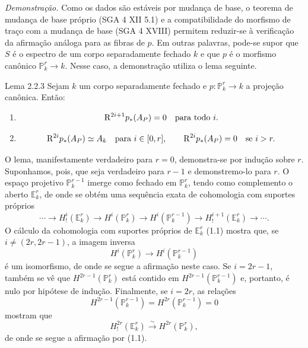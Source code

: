 \emph{Demonstração.} Como os dados são estáveis por mudança de base, o teorema de mudança de base próprio (SGA 4 XII 5.1) e a compatibilidade do morfismo de traço com a mudança de base (SGA 4 XVIII) permitem reduzir-se à verificação da afirmação análoga para as fibras de $p$. Em outras palavras, pode-se supor que $S$ é o espectro de um corpo separadamente fechado $k$ e que $p$ é o morfismo canônico $\mathbb P^r_k\to k$. Nesse caso, a demonstração utiliza o lema seguinte.

\begin{statement}{Lema 2.2.3}
Sejam $k$ um corpo separadamente fechado e $p:\mathbb P_k^r\to k$ a projeção canônica. Então:
\begin{enumerate}[label=\alph*)]
\item
\[
\mathrm{R}^{2i+1}p_*(A_P)=0\quad\text{para todo }i.
\]
\item
\[
\mathrm{R}^{2i}p_*(A_P)\simeq A_k\quad\text{para }i\in[0,r],
\qquad
\mathrm{R}^{2i}p_*(A_P)=0\quad\text{se }i>r.
\]
\end{enumerate}
\end{statement}

O lema, manifestamente verdadeiro para $r=0$, demonstra-se por indução sobre $r$. Suponhamos, pois, que seja verdadeiro para $r-1$ e demonstremo-lo para $r$. O espaço projetivo $\mathbb P_k^{r-1}$ imerge como fechado em $\mathbb P_k^r$, tendo como complemento o aberto $\mathbb E_k^r$, de onde se obtém uma sequência exata de cohomologia com suportes próprios
\[
\cdots\longrightarrow H_!^i(\mathbb E_k^r)\longrightarrow H^i(\mathbb P_k^r)
\longrightarrow H^i(\mathbb P_k^{r-1})\longrightarrow H_!^{i+1}(\mathbb E_k^r)\longrightarrow\cdots.
\]
O cálculo da cohomologia com suportes próprios de $\mathbb E_k^r$ (1.1) mostra que, se $i\ne(2r,2r-1)$, a imagem inversa
\[
H^i(\mathbb P_k^r)\longrightarrow H^i(\mathbb P_k^{r-1})
\]
é um isomorfismo, de onde se segue a afirmação neste caso. Se $i=2r-1$, também se vê que $H^{2r-1}(\mathbb P_k^r)$ está contido em $H^{2r-1}(\mathbb P_k^{r-1})$ e, portanto, é nulo por hipótese de indução. Finalmente, se $i=2r$, as relações
\[
H^{2r-1}(\mathbb P_k^{r-1})=H^{2r}(\mathbb P_k^{r-1})=0
\]
mostram que
\[
H_!^{2r}(\mathbb E_k^r)\xrightarrow{\sim}H^{2r}(\mathbb P_k^r),
\]
de onde se segue a afirmação por (1.1).
